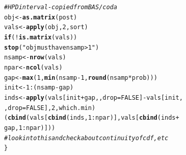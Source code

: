 \documentclass[AMA,STIX1COL]{WileyNJD-v2}\usepackage[]{graphicx}\usepackage[]{color}
\makeatletter
\newcommand{\hlnum}[1]{\textcolor[rgb]{0.686,0.059,0.569}{#1}}%
\newcommand{\hlstr}[1]{\textcolor[rgb]{0.192,0.494,0.8}{#1}}%
\newcommand{\hlcom}[1]{\textcolor[rgb]{0.678,0.584,0.686}{\textit{#1}}}%
\newcommand{\hlopt}[1]{\textcolor[rgb]{0,0,0}{#1}}%
\newcommand{\hlstd}[1]{\textcolor[rgb]{0.345,0.345,0.345}{#1}}%
\newcommand{\hlkwa}[1]{\textcolor[rgb]{0.161,0.373,0.58}{\textbf{#1}}}%
\newcommand{\hlkwb}[1]{\textcolor[rgb]{0.69,0.353,0.396}{#1}}%
\newcommand{\hlkwc}[1]{\textcolor[rgb]{0.333,0.667,0.333}{#1}}%
\newcommand{\hlkwd}[1]{\textcolor[rgb]{0.737,0.353,0.396}{\textbf{#1}}}%
\newenvironment{kframe}{%
 \def\at@end@of@kframe{}%
 \ifinner\ifhmode%
  \def\at@end@of@kframe{\end{minipage}}%
  \begin{minipage}{\columnwidth}%
 \fi\fi%
 \def\FrameCommand##1{\hskip\@totalleftmargin \hskip-\fboxsep
 \colorbox{shadecolor}{##1}\hskip-\fboxsep
     \hskip-\linewidth \hskip-\@totalleftmargin \hskip\columnwidth}%
 \MakeFramed {\advance\hsize-\width
   \@totalleftmargin\z@ \linewidth\hsize
   \@setminipage}}%
 {\par\unskip\endMakeFramed%
 \at@end@of@kframe}
\newenvironment{knitrout}{}{} %
\makeatother
\begin{document}
\begin{knitrout}
\begin{kframe}
\begin{alltt}
  \hlcom{#HPD interval- copied from BAS/coda}
  \hlstd{obj} \hlkwb{<-} \hlkwd{as.matrix}\hlstd{(post)}
  \hlstd{vals} \hlkwb{<-} \hlkwd{apply}\hlstd{(obj,} \hlnum{2}\hlstd{, sort)}
  \hlkwa{if} \hlstd{(}\hlopt{!}\hlkwd{is.matrix}\hlstd{(vals))}
    \hlkwd{stop}\hlstd{(}\hlstr{"obj must have nsamp > 1"}\hlstd{)}
  \hlstd{nsamp} \hlkwb{<-} \hlkwd{nrow}\hlstd{(vals)}
  \hlstd{npar} \hlkwb{<-} \hlkwd{ncol}\hlstd{(vals)}
  \hlstd{gap} \hlkwb{<-} \hlkwd{max}\hlstd{(}\hlnum{1}\hlstd{,} \hlkwd{min}\hlstd{(nsamp} \hlopt{-} \hlnum{1}\hlstd{,} \hlkwd{round}\hlstd{(nsamp} \hlopt{*} \hlstd{prob)))}
  \hlstd{init} \hlkwb{<-} \hlnum{1}\hlopt{:}\hlstd{(nsamp} \hlopt{-} \hlstd{gap)}
  \hlstd{inds} \hlkwb{<-} \hlkwd{apply}\hlstd{(vals[init} \hlopt{+} \hlstd{gap, ,} \hlkwc{drop} \hlstd{=} \hlnum{FALSE}\hlstd{]} \hlopt{-} \hlstd{vals[init,}
                                                        \hlstd{,} \hlkwc{drop} \hlstd{=} \hlnum{FALSE}\hlstd{],} \hlnum{2}\hlstd{, which.min)}
  \hlstd{(}\hlkwd{cbind}\hlstd{(vals[}\hlkwd{cbind}\hlstd{(inds,} \hlnum{1}\hlopt{:}\hlstd{npar)], vals[}\hlkwd{cbind}\hlstd{(inds} \hlopt{+}
                                                 \hlstd{gap,} \hlnum{1}\hlopt{:}\hlstd{npar)]))}
  \hlcom{#look into this and check about continuity of cdf, etc}
\hlstd{\}}
\end{alltt}
\end{kframe}
\end{knitrout}
\end{document}
